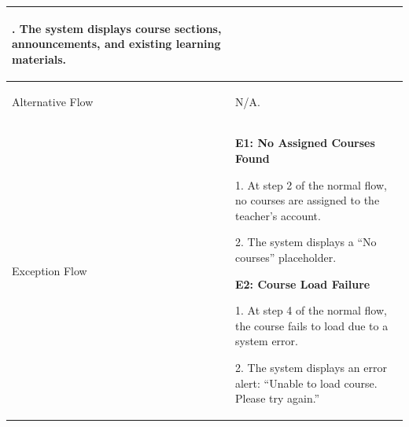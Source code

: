 {\begin{longtable}{|>{\bfseries\raggedright\arraybackslash}p{}|>{\raggedright\arraybackslash}p{}|}
5. The system displays course sections, announcements, and existing learning materials.\\ \hline
Alternative Flow &
N/A. \\ \hline
Exception Flow &
\textbf{E1: No Assigned Courses Found} \par
1. At step 2 of the normal flow, no courses are assigned to the teacher's account. \par
2. The system displays a ``No courses'' placeholder. \par\vspace{4pt}
\textbf{E2: Course Load Failure} \par
1. At step 4 of the normal flow, the course fails to load due to a system error. \par
2. The system displays an error alert: ``Unable to load course. Please try again.'' \\ \hline
\end{longtable}
}

